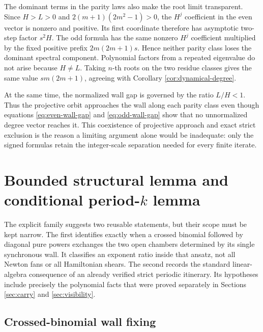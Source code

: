\documentclass[11pt]{article}
\theoremstyle{definition}
\theoremstyle{remark}
\begin{document}
The dominant terms in the parity laws also make the root limit transparent.
Since \(H>L>0\) and
\(2(m+1)(2m^2-1)>0\), the \(H^j\) coefficient in the even vector is
nonzero and positive.  Its first coordinate therefore has asymptotic
two-step factor \(s^2H\).  The odd formula has the same nonzero
\(H^j\) coefficient multiplied by the fixed positive prefix
\(2m(2m+1)s\).  Hence neither parity class loses the dominant spectral
component.  Polynomial factors from a repeated eigenvalue do not arise
because \(H\neq L\).  Taking \(n\)-th roots on the two residue classes gives
the same value \(sm(2m+1)\), agreeing with Corollary
\ref{cor:dynamical-degree}.

At the same time, the normalized wall gap is governed by the ratio \(L/H<1\).
Thus the projective orbit approaches the wall along each parity class even
though equations \eqref{eq:even-wall-gap} and \eqref{eq:odd-wall-gap} show
that no unnormalized degree vector reaches it.  This coexistence of
projective approach and exact strict exclusion is the reason a limiting
argument alone would be inadequate: only the signed formulas retain the
integer-scale separation needed for every finite iterate.

\section{Bounded structural lemma and conditional \texorpdfstring{period-\(k\)}{period-k} lemma}
\label{sec:structural}

The explicit family suggests two reusable statements, but their scope must be
kept narrow.  The first identifies exactly when a crossed binomial followed
by diagonal pure powers exchanges the two open chambers determined by its
single synchronous wall.  It classifies an exponent ratio inside that
ansatz, not all Newton fans or all Hamiltonian shears.  The second records the
standard linear-algebra consequence of an already verified strict periodic
itinerary.  Its hypotheses include precisely the polynomial facts that were
proved separately in Sections \ref{sec:carry} and \ref{sec:visibility}.

\subsection{Crossed-binomial wall fixing}
\end{document}
